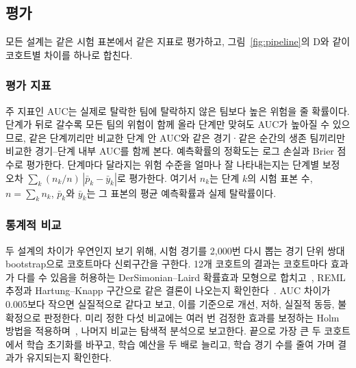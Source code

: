 \subsection{평가}
\label{sec:method:evaluation}
모든 설계는 같은 시험 표본에서 같은 지표로 평가하고, 그림~\ref{fig:pipeline}의 D와 같이 코호트별 차이를 하나로 합친다.

\subsubsection{평가 지표}
주 지표인 AUC는 실제로 탈락한 팀에 탈락하지 않은 팀보다 높은 위험을 줄 확률이다.
단계가 뒤로 갈수록 모든 팀의 위험이 함께 올라 단계만 맞혀도 AUC가 높아질 수 있으므로, 같은 단계끼리만 비교한 단계 안 AUC와 같은 경기·같은 순간의 생존 팀끼리만 비교한 경기--단계 내부 AUC를 함께 본다.
예측확률의 정확도는 로그 손실과 Brier 점수로 평가한다.
단계마다 달라지는 위험 수준을 얼마나 잘 나타내는지는 단계별 보정 오차 $\sum_{k}(n_k/n)\,|\bar{p}_k-\bar{y}_k|$로 평가한다. 여기서 $n_k$는 단계 $k$의 시험 표본 수, $n=\sum_k n_k$, $\bar{p}_k$와 $\bar{y}_k$는 그 표본의 평균 예측확률과 실제 탈락률이다.

\subsubsection{통계적 비교}
두 설계의 차이가 우연인지 보기 위해, 시험 경기를 2,000번 다시 뽑는 경기 단위 쌍대 bootstrap으로 코호트마다 신뢰구간을 구한다.
12개 코호트의 결과는 코호트마다 효과가 다를 수 있음을 허용하는 DerSimonian--Laird 확률효과 모형으로 합치고~\cite{DerSimonian86}, REML 추정과 Hartung--Knapp 구간으로 같은 결론이 나오는지 확인한다~\cite{HartungKnapp01}.
AUC 차이가 0.005보다 작으면 실질적으로 같다고 보고, 이를 기준으로 개선, 저하, 실질적 동등, 불확정으로 판정한다.
미리 정한 다섯 비교에는 여러 번 검정한 효과를 보정하는 Holm 방법을 적용하며~\cite{Holm79}, 나머지 비교는 탐색적 분석으로 보고한다.
끝으로 가장 큰 두 코호트에서 학습 초기화를 바꾸고, 학습 예산을 두 배로 늘리고, 학습 경기 수를 줄여 가며 결과가 유지되는지 확인한다.
